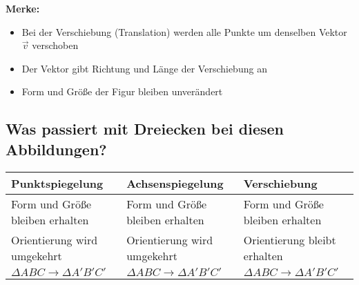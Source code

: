 \begin{center}
\end{center}

\textbf{Merke:}
\begin{itemize}
    \item Bei der Verschiebung (Translation) werden alle Punkte um denselben Vektor $\vec{v}$ verschoben
    \item Der Vektor gibt Richtung und Länge der Verschiebung an
    \item Form und Größe der Figur bleiben unverändert
\end{itemize}

\subsection*{Was passiert mit Dreiecken bei diesen Abbildungen?}

\begin{center}
\begin{tabular}{|p{4cm}|p{4cm}|p{4cm}|}
\hline
\textbf{Punktspiegelung} & \textbf{Achsenspiegelung} & \textbf{Verschiebung} \\
\hline
Form und Größe bleiben erhalten & Form und Größe bleiben erhalten & Form und Größe bleiben erhalten \\
\hline
Orientierung wird umgekehrt & Orientierung wird umgekehrt & Orientierung bleibt erhalten \\
\hline
$\Delta ABC \to \Delta A'B'C'$ & $\Delta ABC \to \Delta A'B'C'$ & $\Delta ABC \to \Delta A'B'C'$ \\
\hline
\end{tabular}
\end{center}

